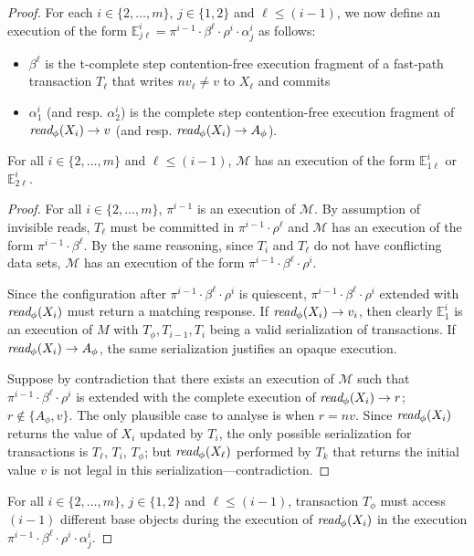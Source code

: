 \begin{proof}
For each $i\in \{2,\ldots, m\}$, $j\in \{1,2\}$ and $\ell \leq (i-1)$, 
we now define an execution of the form  $\mathbb{E}_{j\ell}^{i}=\pi^{i-1}\cdot \beta^{\ell}\cdot \rho^i \cdot \alpha_j^i$
as follows:
%
\begin{itemize}
\item
$\beta^{\ell}$ is the t-complete step contention-free execution fragment of a fast-path transaction $T_{\ell}$
that writes $nv_{\ell}\neq v$ to $X_{\ell}$ and commits
\item
$\alpha_1^i$ (and resp. $\alpha_2^i$) is the complete step contention-free execution fragment of 
$\textit{read}_{\phi}(X_i) \rightarrow v$ (and resp. $\textit{read}_{\phi}(X_i) \rightarrow A_{\phi}$).
\end{itemize}
%
\begin{claim}
\label{cl:ic2}
For all $i\in \{2,\ldots, m\}$ and $\ell \leq (i-1)$, $\mathcal{M}$ has an execution of the form $\mathbb{E}_{1\ell}^{i}$ or 
$\mathbb{E}_{2\ell}^{i}$.
\end{claim}
%
\begin{proof}
%
For all $i \in \{2,\ldots, m\}$, $\pi^{i-1}$
is an execution of $\mathcal{M}$.
By assumption of invisible reads, $T_{{\ell}}$ must be committed in $\pi^{i-1}\cdot \rho^{\ell}$
and $\mathcal{M}$ has an execution of the form $\pi^{i-1}\cdot \beta^{\ell}$.
By the same reasoning, since $T_i$ and $T_{\ell}$ do not have conflicting data sets,
$\mathcal{M}$ has an execution of the form $\pi^{i-1}\cdot\beta^{\ell}\cdot \rho^i$.

Since the configuration after $\pi^{i-1}\cdot\beta^{\ell}\cdot \rho^i$ is quiescent,
$\pi^{i-1}\cdot\beta^{\ell}\cdot \rho^i$ extended with $\textit{read}_{\phi}(X_i)$
must return a matching response.
If $\textit{read}_{\phi}(X_i) \rightarrow v_i$, then clearly $\mathbb{E}_{1}^{i}$
is an execution of $M$ with $T_{\phi}, T_{i-1}, T_i$ being a valid serialization
of transactions.
If $\textit{read}_{\phi}(X_i) \rightarrow A_{\phi}$, the same serialization
justifies an opaque execution.

Suppose by contradiction that there exists an execution of $\mathcal{M}$ such that
$\pi^{i-1}\cdot\beta^{\ell}\cdot \rho^i$ is extended with the complete execution
of $\textit{read}_{\phi}(X_i) \rightarrow r$; $r \not\in \{A_{\phi},v\}$. 
The only plausible case to analyse is when $r=nv$.
Since $\textit{read}_{\phi}(X_i)$ returns the value of $X_i$ updated by $T_i$, 
the only possible serialization for transactions is $T_{\ell}$, $T_i$, $T_{\phi}$; but $\textit{read}_{\phi}(X_{\ell})$
performed by $T_k$ that returns the initial value $v$
is not legal in this serialization---contradiction.
\end{proof}
%
%
For all $i\in \{2,\ldots, m\}$, $j\in \{1,2\}$ and $\ell \leq (i-1)$, transaction $T_{\phi}$ must access
$(i-1)$ different base objects during the execution of $\textit{read}_{\phi}(X_i)$ in the execution
$\pi^{i-1}\cdot \beta^{\ell}\cdot \rho^i \cdot \alpha_j^i$.


\end{proof}
